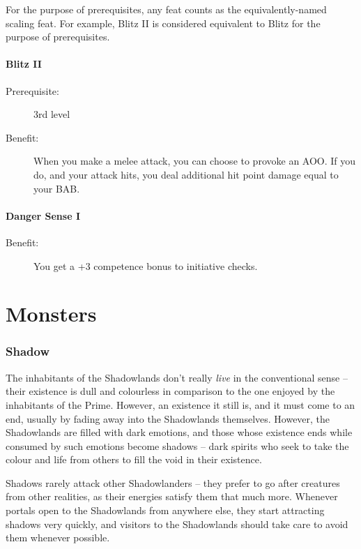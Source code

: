 \documentclass[10pt]{article}
\begin{document}
For the purpose of prerequisites, any feat counts as the equivalently-named scaling feat. For example, Blitz II is considered equivalent to Blitz for the purpose of prerequisites.

\subsection*{Blitz II}
\begin{description}
\item[Prerequisite:] 3rd level
\item[Benefit:] When you make a melee attack, you can choose to provoke an AOO. If you do, and your attack hits, you deal additional hit point damage equal to your BAB.
\end{description}

\subsection*{Danger Sense I}
\begin{description}
\item[Benefit:] You get a +3 competence bonus to initiative checks.
\end{description}

\pagebreak
\part{Monsters}
\section{Shadow}

The inhabitants of the Shadowlands don't really {\em live} in the conventional sense -- their existence is dull and colourless in comparison to the one enjoyed by the inhabitants of the Prime. However, an existence it still is, and it must come to an end, usually by fading away into the Shadowlands themselves. However, the Shadowlands are filled with dark emotions, and those whose existence ends while consumed by such emotions become shadows -- dark spirits who seek to take the colour and life from others to fill the void in their existence.

Shadows rarely attack other Shadowlanders -- they prefer to go after creatures from other realities, as their energies satisfy them that much more. Whenever portals open to the Shadowlands from anywhere else, they start attracting shadows very quickly, and visitors to the Shadowlands should take care to avoid them whenever possible.
\end{document}
